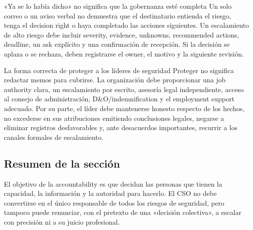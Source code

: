 
\begin{warningbox}{«Ya se lo había dicho» no significa que la gobernanza esté completa}
Un solo correo o un aviso verbal no demuestra que el destinatario entienda el riesgo, tenga el decision right o haya completado las acciones siguientes. Un escalamiento de alto riesgo debe incluir severity, evidence, unknowns, recommended actions, deadline, un ask explícito y una confirmación de recepción. Si la decisión se aplaza o se rechaza, deben registrarse el owner, el motivo y la siguiente revisión.
\end{warningbox}

\begin{importantbox}{La forma correcta de proteger a los líderes de seguridad}
Proteger no significa redactar memos para cubrirse. La organización debe proporcionar una job authority clara, un escalamiento por escrito, asesoría legal independiente, acceso al consejo de administración, D\&O/indemnification y el employment support adecuado. Por su parte, el líder debe mantenerse honesto respecto de los hechos, no excederse en sus atribuciones emitiendo conclusiones legales, negarse a eliminar registros desfavorables y, ante desacuerdos importantes, recurrir a los canales formales de escalamiento.
\end{importantbox}

\subsection{Resumen de la sección}

El objetivo de la accountability es que decidan las personas que tienen la capacidad, la información y la autoridad para hacerlo. El CSO no debe convertirse en el único responsable de todos los riesgos de seguridad, pero tampoco puede renunciar, con el pretexto de una «decisión colectiva», a escalar con precisión ni a su juicio profesional.
